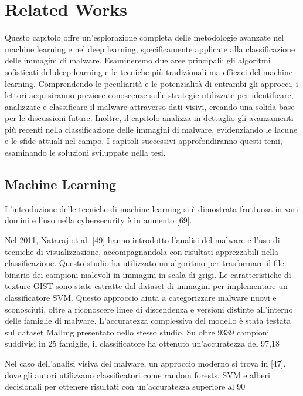 \chapter{Related Works}
\label{cap:RelatedWorks}
Questo capitolo offre un'esplorazione completa delle metodologie avanzate nel machine learning e nel deep learning, specificamente applicate alla classificazione delle immagini di malware. Esamineremo due aree principali: gli algoritmi sofisticati del deep learning e le tecniche più tradizionali ma efficaci del machine learning. Comprendendo le peculiarità e le potenzialità di entrambi gli approcci, i lettori acquisiranno preziose conoscenze sulle strategie utilizzate per identificare, analizzare e classificare il malware attraverso dati visivi, creando una solida base per le discussioni future. Inoltre, il capitolo analizza in dettaglio gli avanzamenti più recenti nella classificazione delle immagini di malware, evidenziando le lacune e le sfide attuali nel campo. I capitoli successivi approfondiranno questi temi, esaminando le soluzioni sviluppate nella tesi.

\section{Machine Learning}
L'introduzione delle tecniche di machine learning si è dimostrata fruttuosa in vari domini e l'uso nella cybersecurity è in aumento [69].

Nel 2011, Nataraj et al. [49] hanno introdotto l'analisi del malware e l'uso di tecniche di visualizzazione, accompagnandola con risultati apprezzabili nella classificazione. Questo studio ha utilizzato un algoritmo per trasformare il file binario dei campioni malevoli in immagini in scala di grigi. Le caratteristiche di texture GIST sono state estratte dal dataset di immagini per implementare un classificatore SVM. Questo approccio aiuta a categorizzare malware nuovi e sconosciuti, oltre a riconoscere linee di discendenza e versioni distinte all'interno delle famiglie di malware. L'accuratezza complessiva del modello è stata testata sul dataset MalImg presentato nello stesso studio. Su oltre 9339 campioni suddivisi in 25 famiglie, il classificatore ha ottenuto un'accuratezza del 97,18%

Nel caso dell'analisi visiva del malware, un approccio moderno si trova in [47], dove gli autori utilizzano classificatori come random forests, SVM e alberi decisionali per ottenere risultati con un'accuratezza superiore al 90%


